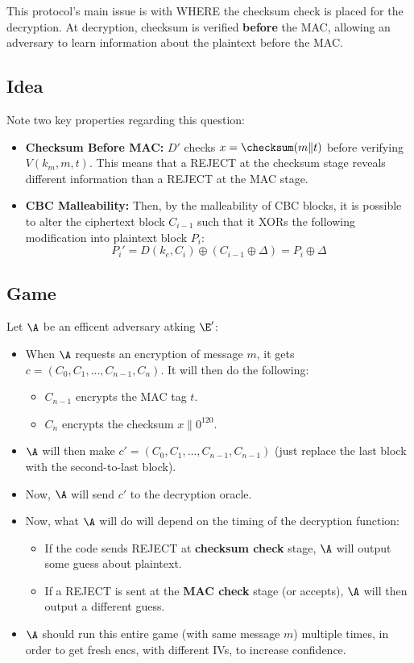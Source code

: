 \documentclass[12pt]{article}
\begin{document}
\begin{solution}
This protocol's main issue is with WHERE the checksum check is placed for the decryption. At decryption, checksum is verified \textbf{before} the MAC, allowing an adversary to learn information about the plaintext before the MAC.

\subsection*{Idea}
Note two key properties regarding this question:
\begin{itemize}
    \item \textbf{Checksum Before MAC:} $D'$ checks $x = \checksum(m \| t)$ before verifying $V(k_m, m, t)$. This means that a REJECT at the checksum stage reveals different information than a REJECT at the MAC stage.
    \item \textbf{CBC Malleability:} Then, by the malleability of CBC blocks, it is possible to alter the ciphertext block $C_{i-1}$ such that it XORs the following modification into plaintext block $P_i$:
    \begin{equation*}
        P_i' = D(k_e, C_i) \oplus (C_{i-1} \oplus \Delta) = P_i \oplus \Delta
    \end{equation*}
\end{itemize}

\subsection*{Game}
Let $\A$ be an efficent adversary atking $\E'$:
\begin{itemize}
    \item When $\A$ requests an encryption of message $m$, it gets $c = (C_0, C_1, \ldots, C_{n-1}, C_n)$. It will then do the following:
    \begin{itemize}
        \item $C_{n-1}$ encrypts the MAC tag $t$.
        \item $C_n$ encrypts the checksum $x \| 0^{120}$.
    \end{itemize}
    \item $\A$ will then make $c' = (C_0, C_1, \ldots, C_{n-1}, C_{n-1})$ (just replace the last block with the second-to-last block).
    \item Now, $\A$ will send $c'$ to the decryption oracle.
    \item Now, what $\A$ will do will depend on the timing of the decryption function:
    \begin{itemize}
        \item If the code sends REJECT at \textbf{checksum check} stage, $\A$ will output some guess about plaintext.
        \item If a REJECT is sent at the \textbf{MAC check} stage (or accepts), $\A$ will then output a different guess.
    \end{itemize}
    \item $\A$ should run this entire game (with same message $m$) multiple times, in order to get fresh encs, with different IVs, to increase confidence.
\end{itemize}


\end{solution}
\end{document}
